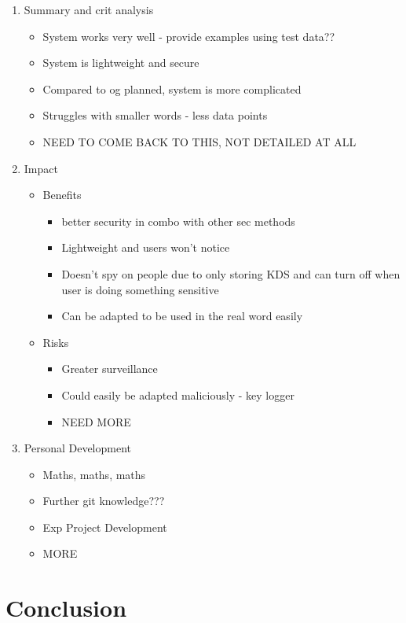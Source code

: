 \documentclass[10pt,a4paper]{report}
\begin{document}
\begin{enumerate}
	\item Summary and crit analysis
	\begin{itemize}
		\item System works very well - provide examples using test data??
		\item System is lightweight and secure
		\item Compared to og planned, system is more complicated
		\item Struggles with smaller words - less data points
		\item NEED TO COME BACK TO THIS, NOT DETAILED AT ALL
	\end{itemize}
	\item Impact
	\begin{itemize}
		\item Benefits 
		\begin{itemize}
			\item better security in combo with other sec methods
			\item Lightweight and users won't notice
			\item Doesn't spy on people due to only storing KDS and can turn off when user is doing something sensitive
			\item Can be adapted to be used in the real word easily
		\end{itemize}
		\item Risks
		\begin{itemize}
			\item Greater surveillance
			\item Could easily be adapted maliciously - key logger
			\item NEED MORE
		\end{itemize}
	\end{itemize}
	\item Personal Development
	\begin{itemize}
		\item Maths, maths, maths
		\item Further git knowledge???
		\item Exp Project Development
		\item MORE
	\end{itemize}
\end{enumerate}
\chapter{Conclusion}


\end{document}
